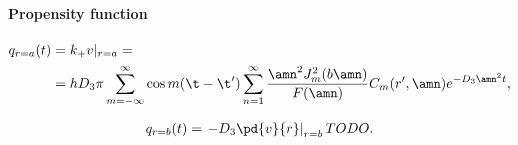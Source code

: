 \paragraph{Propensity function}
\begin{align}
  q_{r=a}(t) &= k_+ v|_{r=a} =\\
	     &=
  h D_3 \pi \sum_{m=-\infty}^{\infty} \cos m(\t-\t')
  \sum_{n=1}^{\infty} \frac{\amn^2 J_m^2(b\amn)}{F(\amn)}
  C_m(r',\amn)e^{-D_3\amn^2t},
\end{align}

\begin{align}
  q_{r=b}(t) = \left.- D_3 \pd{v}{r}\right|_{r=b}
  TODO.
\end{align}
